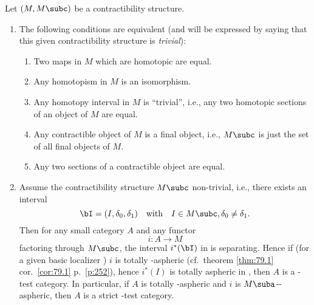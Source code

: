 \begin{corollarynum}\label{cor:95.1}
  Let $(M,M\subc)$ be a contractibility structure.
  \begin{enumerate}[label=\alph*),font=\normalfont]
  \item\label{it:95.cor1.a}
    The following conditions are equivalent \textup(and will be
    expressed by saying that this given contractibility structure is
    \emph{trivial}\textup):
    \begin{enumerate}[label=(\roman*),font=\normalfont]
    \item\label{it:95.cor1.a.i}
      Two maps in $M$ which are homotopic are equal.
    \item\label{it:95.cor1.a.ii}
      Any homotopism in $M$ is an isomorphism.
    \item\label{it:95.cor1.a.iii}
      Any homotopy interval in $M$ is ``trivial'', i.e., any two
      homotopic sections of an object of $M$ are equal.
    \item\label{it:95.cor1.a.iv}
      Any contractible object of $M$ is a final object, i.e., $M\subc$
      is just the set of all final objects of $M$.
    \item\label{it:95.cor1.a.v}
      Any two sections of a contractible object are equal.
    \end{enumerate}
  \item\label{it:95.cor1.b}
    Assume the contractibility structure $M\subc$
    non-trivial, i.e., there exists an interval
    \[\bI=(I,\delta_0,\delta_1)\quad\text{with}\quad I\in M\subc,
    \delta_0\ne\delta_1.\]
    Then for any small category $A$ and any functor
    \[i:A\to M\]
    factoring through $M\subc$, the interval $i^*(\bI)$ in \Ahat{} is
    separating. Hence if \textup(for a given basic localizer
    \scrW\textup) $i$ is totally \scrW-aspheric \textup(cf.\ theorem
    \ref{thm:79.1} cor.\ \ref{cor:79.1} p.\ \ref{p:252}\textup), hence
    $i^*(I)$ is totally aspheric in \Ahat, then $A$ is a \scrW-test
    category. In particular, if $A$ is totally \scrW-aspheric and $i$
    is $M\suba$-\scrW-aspheric, then $A$ is a strict \scrW-test category.
  \end{enumerate}
\end{corollarynum}

